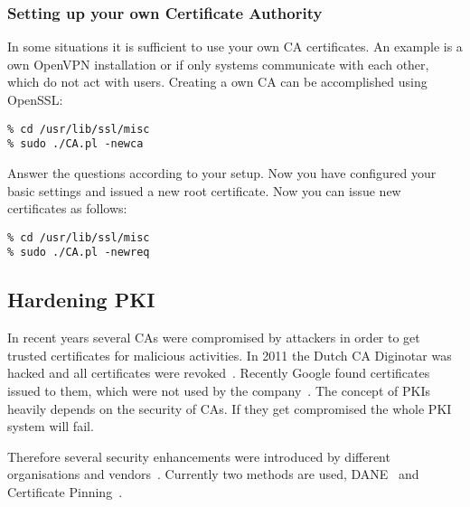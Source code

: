 \subsubsection{Setting up your own Certificate Authority}
\label{sec:setupownca}
In some situations it is sufficient to use your own CA certificates. An example is a own OpenVPN
installation or if only systems communicate with each other, which do not act with users. Creating
a own CA can be accomplished using OpenSSL:

\begin{lstlisting}
% cd /usr/lib/ssl/misc
% sudo ./CA.pl -newca
\end{lstlisting}

Answer the questions according to your setup. Now you have configured your basic settings and 
issued a new root certificate. Now you can issue new certificates as follows:

\begin{lstlisting}
% cd /usr/lib/ssl/misc
% sudo ./CA.pl -newreq
\end{lstlisting}

\subsection{Hardening PKI}
\label{sec:hardeningpki}
In recent years several CAs were compromised by attackers in order to
get trusted certificates for malicious activities. In 2011 the Dutch
CA Diginotar was hacked and all certificates were
revoked~\cite{diginotar-hack}. Recently Google found certificates
issued to them, which were not used by the
company~\cite{googlecahack}. The concept of PKIs heavily depends on the
security of CAs.  If they get compromised the whole PKI system will
fail.

Therefore several security enhancements were introduced by different
organisations and vendors~\cite{tschofenig-webpki}. Currently two
methods are used, DANE~\cite{rfc6698} and Certificate
Pinning~\cite{draft-ietf-websec-key-pinning}.





